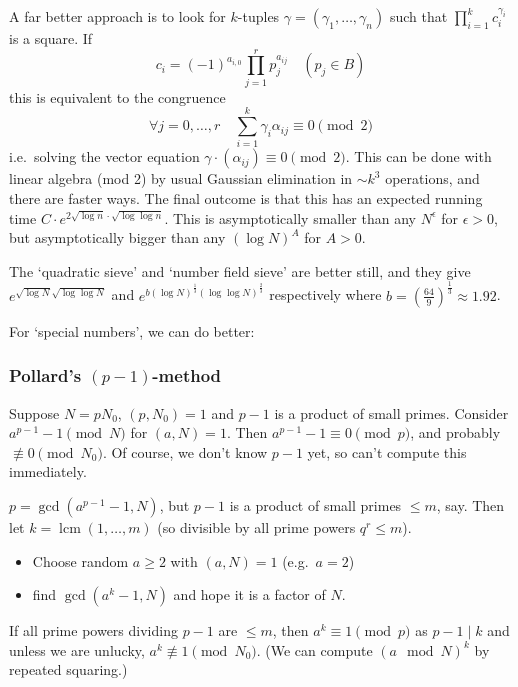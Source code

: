 \documentclass{article}
\begin{document}
A far better approach is to look for $k$-tuples $\gamma = (\gamma_1, \dotsc, \gamma_n)$ such that $\prod_{i=1}^k c_i^{\gamma_i}$ is a square.
If
\begin{equation*}
    c_i = (-1)^{a_{i, 0}} \prod_{j=1}^r p_j^{a_{ij}} \quad (p_j \in B)
\end{equation*}
this is equivalent to the congruence
\begin{equation*}
    \forall j=0,\dotsc,r \quad \sum_{i=1}^k \gamma_i \alpha_{ij} \equiv 0 \pmod{2}
\end{equation*}
i.e.\ solving the vector equation $\gamma \cdot \left(\alpha_{ij}\right) \equiv 0 \pmod{2}$.
This can be done with linear algebra (mod 2) by usual Gaussian elimination in $\sim k^3$ operations, and there are faster ways.
The final outcome is that this has an expected running time $C \cdot e^{2 \sqrt{\log n} \cdot \sqrt{\log \log n}}$.
This is asymptotically smaller than any $N^\epsilon$ for $\epsilon > 0$, but asymptotically bigger than any $(\log N)^A$ for $A > 0$.
\begin{remark}
    The `quadratic sieve' and `number field sieve' are better still, and they give $e^{\sqrt{\log N} \sqrt{\log \log N}}$ and $e^{b (\log N)^{\frac{1}{3}} (\log \log N)^{\frac{2}{3}}}$ respectively where $b = \left(\frac{64}{9}\right)^{\frac{1}{3}} \approx 1.92$.
\end{remark}

For `special numbers', we can do better:
\subsubsection*{Pollard's $(p-1)$-method}
Suppose $N = p N_0$, $(p, N_0) = 1$ and $p-1$ is a product of small primes.
Consider $a^{p-1} - 1 \pmod{N}$ for $(a, N) = 1$. Then $a^{p-1} - 1 \equiv 0 \pmod{p}$, and probably $\not\equiv 0 \pmod{N_0}$.
Of course, we don't know $p-1$ yet, so can't compute this immediately.

$p = \gcd(a^{p-1}-1, N)$, but $p-1$ is a product of small primes $\leq m$, say.
Then let $k = \operatorname{lcm}(1,\dotsc, m)$ (so divisible by all prime powers $q^r \leq m$).
\begin{itemize}[label=--]
    \item Choose random $a \geq 2$ with $(a,N) = 1$ (e.g.\ $a=2$)
    \item find $\gcd(a^k-1, N)$ and hope it is a factor of $N$.
\end{itemize}
If all prime powers dividing $p-1$ are $\leq m$, then $a^k \equiv 1 \pmod{p}$ as $p-1 \mid k$ and unless we are unlucky, $a^k \not\equiv 1 \pmod{N_0}$.
(We can compute $(a \mod N)^k$ by repeated squaring.)
\end{document}
